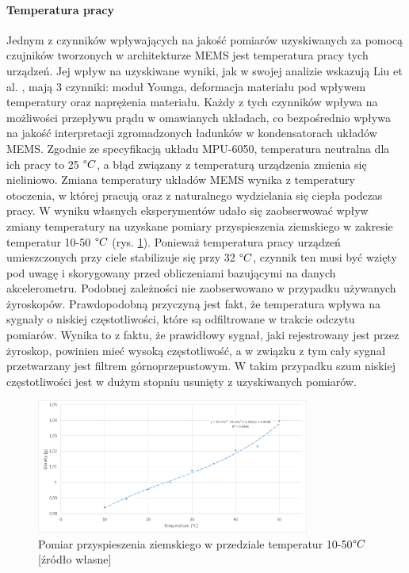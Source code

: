 \paragraph*{Temperatura pracy}
Jednym z czynników wpływających na jakość pomiarów uzyskiwanych za pomocą czujników tworzonych w architekturze MEMS jest temperatura pracy tych urządzeń.
Jej wpływ na uzyskiwane wyniki, jak w swojej analizie wskazują Liu et al. \cite{Liu2007, Liu2015}, mają 3 czynniki: moduł Younga, deformacja materiału pod wpływem temperatury oraz naprężenia materiału. Każdy z tych czynników wpływa na możliwości przepływu prądu w omawianych układach, co bezpośrednio wpływa na jakość interpretacji zgromadzonych ładunków w kondensatorach układów MEMS. Zgodnie ze specyfikacją układu MPU-6050, temperatura neutralna dla ich pracy to 25 $\degree C$, a błąd związany z temperaturą urządzenia zmienia się nieliniowo. Zmiana temperatury układów MEMS wynika z temperatury otoczenia, w której pracują oraz z naturalnego wydzielania się ciepła podczas pracy. W wyniku własnych eksperymentów udało się zaobserwować wpływ zmiany temperatury na uzyskane pomiary przyspieszenia ziemskiego w zakresie temperatur 10-50 $\degree C$ (rys. \ref{fig:characteristics:imu:temp}). Ponieważ temperatura pracy urządzeń umieszczonych przy ciele stabilizuje się przy 32 $\degree C$, czynnik ten musi być wzięty pod uwagę i skorygowany przed obliczeniami bazującymi na danych akcelerometru. Podobnej zależności nie zaobserwowano w przypadku używanych żyroskopów. Prawdopodobną przyczyną jest fakt, że temperatura wpływa na sygnały o niskiej częstotliwości, które są odfiltrowane w trakcie odczytu pomiarów. Wynika to z faktu, że prawidłowy sygnał, jaki rejestrowany jest przez żyroskop, powinien mieć wysoką częstotliwość, a w związku z tym cały sygnał przetwarzany jest filtrem górnoprzepustowym. W takim przypadku szum niskiej częstotliwości jest w dużym stopniu usunięty z uzyskiwanych pomiarów.
		
\begin{figure}
	\centering
	\includegraphics[width=0.8\textwidth]{images/temp.png}
	\caption{Pomiar przyspieszenia ziemskiego w przedziale temperatur 10-50$\degree C$ [źródło własne]}
	\label{fig:characteristics:imu:temp}
\end{figure}
		
